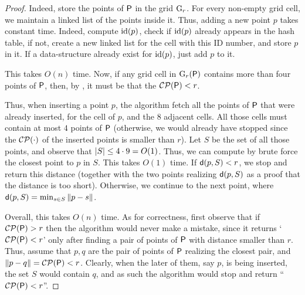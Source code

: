 \begin{proof}
    Indeed, store the points of ${\mathsf{P}}$ in the grid $\mathrm{G}_r$. For every
    non-empty grid cell, we maintain a linked list of the points
    inside it. Thus, adding a new point $p$ takes constant time.
    Indeed, compute $\mathrm{id}(p)$, check if $\mathrm{id}(p)$ already appears in the
    hash table, if not, create a new linked list for the cell with
    this ID number, and store $p$ in it. If a data-structure already
    exist for $\mathrm{id}(p)$, just add $p$ to it.
    
    This takes $O(n)$ time. Now, if any grid cell in
    $\mathrm{G}_r({\mathsf{P}})$ contains more than four points of ${\mathsf{P}}$,
    then, by , it must be that the
    $\mathcal{CP}({\mathsf{P}}) < r$.
    
    Thus, when inserting a point $p$, the algorithm fetch all the
    points of ${\mathsf{P}}$ that were already inserted, for the cell of
    $p$, and the $8$ adjacent cells. All those cells must contain at
    most $4$ points of ${\mathsf{P}}$ (otherwise, we would already have
    stopped since the $\mathcal{CP}(\cdot)$ of the inserted points is
    smaller than $r$). Let $S$ be the set of all those points, and
    observe that $\left| {S} \right| \leq 4 \cdot 9 = O(1)$. Thus, we can
    compute by brute force the closest point to $p$ in $S$. This takes
    $O(1)$ time. If $\DistSetY{p}{S} < r$, we stop and return this
    distance (together with the two points realizing $\DistSetY{p}{S}$
    as a proof that the distance is too short). Otherwise, we continue
    to the next point, where
    $\DistSetY{p}{S} = \min_{s \in S} \distY{p}{s}$.
    
    Overall, this takes $O(n)$ time. As for correctness, first observe
    that if $\mathcal{CP}({\mathsf{P}}) >r$ then the algorithm would never
    make a mistake, since it returns `$\mathcal{CP}({\mathsf{P}})<r$' only
    after finding a pair of points of ${\mathsf{P}}$ with distance smaller
    than $r$.  Thus, assume that $p,q$ are the pair of points of
    ${\mathsf{P}}$ realizing the closest pair, and
    $\left\| {p - q} \right\| = \mathcal{CP}({\mathsf{P}})<r$.  Clearly, when the later
    of them, say $p$, is being inserted, the set $S$ would contain
    $q$, and as such the algorithm would stop and return
    ``$\mathcal{CP}({\mathsf{P}}) < r$''.
\end{proof}


